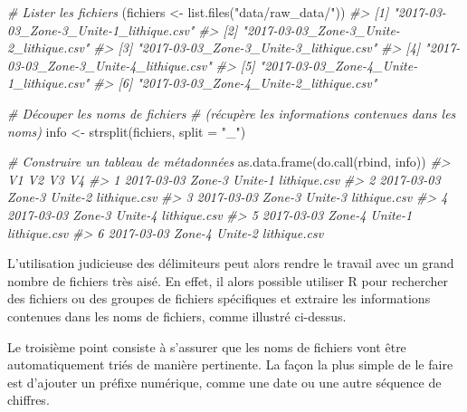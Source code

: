 \documentclass[
  french,
]{scrbook}
\newenvironment{Shaded}{\begin{snugshade}}{\end{snugshade}}
\newcommand{\AttributeTok}[1]{\textcolor[rgb]{0.77,0.63,0.00}{#1}}
\newcommand{\CommentTok}[1]{\textcolor[rgb]{0.56,0.35,0.01}{\textit{#1}}}
\newcommand{\FunctionTok}[1]{\textcolor[rgb]{0.00,0.00,0.00}{#1}}
\newcommand{\NormalTok}[1]{#1}
\newcommand{\OtherTok}[1]{\textcolor[rgb]{0.56,0.35,0.01}{#1}}
\newcommand{\StringTok}[1]{\textcolor[rgb]{0.31,0.60,0.02}{#1}}
\begin{document}
\begin{Shaded}
\begin{Highlighting}[]
\CommentTok{\# Lister les fichiers}
\NormalTok{(fichiers }\OtherTok{\textless{}{-}} \FunctionTok{list.files}\NormalTok{(}\StringTok{"data/raw\_data/"}\NormalTok{))}
\CommentTok{\#\textgreater{} [1] "2017{-}03{-}03\_Zone{-}3\_Unite{-}1\_lithique.csv"}
\CommentTok{\#\textgreater{} [2] "2017{-}03{-}03\_Zone{-}3\_Unite{-}2\_lithique.csv"}
\CommentTok{\#\textgreater{} [3] "2017{-}03{-}03\_Zone{-}3\_Unite{-}3\_lithique.csv"}
\CommentTok{\#\textgreater{} [4] "2017{-}03{-}03\_Zone{-}3\_Unite{-}4\_lithique.csv"}
\CommentTok{\#\textgreater{} [5] "2017{-}03{-}03\_Zone{-}4\_Unite{-}1\_lithique.csv"}
\CommentTok{\#\textgreater{} [6] "2017{-}03{-}03\_Zone{-}4\_Unite{-}2\_lithique.csv"}

\CommentTok{\# Découper les noms de fichiers}
\CommentTok{\# (récupère les informations contenues dans les noms)}
\NormalTok{info }\OtherTok{\textless{}{-}} \FunctionTok{strsplit}\NormalTok{(fichiers, }\AttributeTok{split =} \StringTok{"\_"}\NormalTok{)}

\CommentTok{\# Construire un tableau de métadonnées}
\FunctionTok{as.data.frame}\NormalTok{(}\FunctionTok{do.call}\NormalTok{(rbind, info))}
\CommentTok{\#\textgreater{}           V1     V2      V3           V4}
\CommentTok{\#\textgreater{} 1 2017{-}03{-}03 Zone{-}3 Unite{-}1 lithique.csv}
\CommentTok{\#\textgreater{} 2 2017{-}03{-}03 Zone{-}3 Unite{-}2 lithique.csv}
\CommentTok{\#\textgreater{} 3 2017{-}03{-}03 Zone{-}3 Unite{-}3 lithique.csv}
\CommentTok{\#\textgreater{} 4 2017{-}03{-}03 Zone{-}3 Unite{-}4 lithique.csv}
\CommentTok{\#\textgreater{} 5 2017{-}03{-}03 Zone{-}4 Unite{-}1 lithique.csv}
\CommentTok{\#\textgreater{} 6 2017{-}03{-}03 Zone{-}4 Unite{-}2 lithique.csv}
\end{Highlighting}
\end{Shaded}

L'utilisation judicieuse des délimiteurs peut alors rendre le travail avec un grand nombre de fichiers très aisé. En effet, il alors possible utiliser R pour rechercher des fichiers ou des groupes de fichiers spécifiques et extraire les informations contenues dans les noms de fichiers, comme illustré ci-dessus.

Le troisième point consiste à s'assurer que les noms de fichiers vont être automatiquement triés de manière pertinente. La façon la plus simple de le faire est d'ajouter un préfixe numérique, comme une date ou une autre séquence de chiffres.
\end{document}
